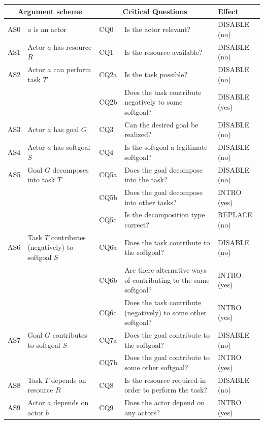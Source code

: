 \begin{table}[t]
\centering
\begin{tabularx}{\textwidth}{|l|l|l|X|l|}
\hline
\multicolumn{2}{|c|}{\textbf{Argument scheme}} & \multicolumn{2}{c|}{\textbf{Critical Questions}} & \textbf{Effect}\\
\hline
AS0 & $a$ is an actor & CQ0 & Is the actor relevant? & \textsf{DISABLE} (no)\\
\hline
AS1 & Actor $a$ has resource $R$ & CQ1 &Is the resource available? & \textsf{DISABLE} (no)\\
\hline
AS2 & Actor $a$ can perform task $T$ & CQ2a &Is the task possible? & \textsf{DISABLE} (no)\\
&& CQ2b & Does the task contribute negatively to some softgoal? & \textsf{DISABLE} (yes)\\
\hline
AS3 & Actor $a$ has goal $G$ & CQ3 & Can the desired goal be realized? & \textsf{DISABLE} (no)\\
\hline
AS4 & Actor $a$ has softgoal $S$ & CQ4 & Is the softgoal a legitimate softgoal?& \textsf{DISABLE} (no)\\
\hline
\hline
AS5 & Goal $G$ decomposes into task $T$ & CQ5a & Does the goal decompose into the task?& \textsf{DISABLE} (no)\\
& & CQ5b & Does the goal decompose into other tasks? & \textsf{INTRO} (yes)\\
 &  & CQ5c & Is the decomposition type correct? & \textsf{REPLACE} (no)\\
\hline
AS6 & Task $T$ contributes (negatively) to softgoal $S$& CQ6a & Does the task contribute to the softgoal?& \textsf{DISABLE} (no)\\
&& CQ6b & Are there alternative ways of contributing to the same softgoal?& \textsf{INTRO} (yes) \\
&& CQ6c & Does the task contribute (negatively) to some other softgoal?& \textsf{INTRO} (yes)\\
\hline
AS7 & Goal $G$ contributes to softgoal $S$ & CQ7a & Does the goal contribute to the softgoal?& \textsf{DISABLE} (no)\\
&& CQ7b & Does the goal contribute to some other softgoal?& \textsf{INTRO} (yes)\\
\hline
AS8 & Task $T$ depends on resource $R$ & CQ8 & Is the resource required in order to perform the task?& \textsf{DISABLE} (no)\\
\hline
AS9 & Actor $a$ depends on actor $b$ & CQ9 & Does the actor depend on any actors?& \textsf{INTRO} (yes)\\

\end{tabularx}
\end{table}

